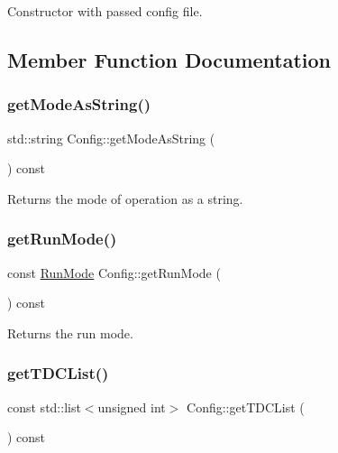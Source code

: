 Constructor with passed config file. 



\subsection{Member Function Documentation}
\mbox{\label{class_config_a3bd48a0ae54bfd982c02564160d6762b}} 
\subsubsection{\texorpdfstring{get\+Mode\+As\+String()}{getModeAsString()}}
{\footnotesize\ttfamily std\+::string Config\+::get\+Mode\+As\+String (\begin{DoxyParamCaption}{ }\end{DoxyParamCaption}) const\hspace{0.3cm}{\ttfamily [private]}}



Returns the mode of operation as a string. 

\mbox{\label{class_config_a1e69242b7f57068005d5ae195ca16530}} 
\subsubsection{\texorpdfstring{get\+Run\+Mode()}{getRunMode()}}
{\footnotesize\ttfamily const \hyperlink{_modes_enum_8hpp_a3dfe11cf1a3a8121f6cd7fec4bf5947e}{Run\+Mode} Config\+::get\+Run\+Mode (\begin{DoxyParamCaption}{ }\end{DoxyParamCaption}) const\hspace{0.3cm}{\ttfamily [inline]}}



Returns the run mode. 

\mbox{\label{class_config_a847bc1cf36b3d12da8590a036634a150}} 
\subsubsection{\texorpdfstring{get\+T\+D\+C\+List()}{getTDCList()}}
{\footnotesize\ttfamily const std\+::list$<$unsigned int$>$ Config\+::get\+T\+D\+C\+List (\begin{DoxyParamCaption}{ }\end{DoxyParamCaption}) const\hspace{0.3cm}{\ttfamily [inline]}}



